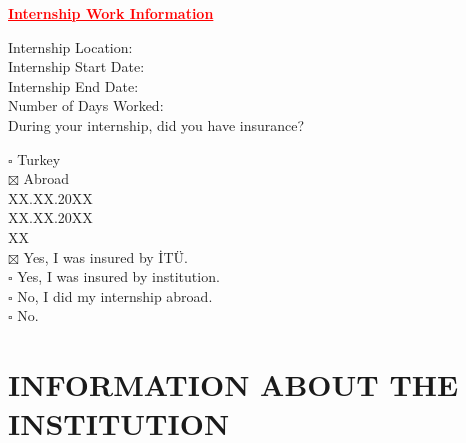 \documentclass[12pt]{article}
\begin{document}
\vspace{150pt}

{\centering
  \textcolor{red}{\bfseries \ul{Internship Work Information}}
  \\[1\baselineskip]
  \par}

\begin{minipage}[t]{0.4\textwidth}
  \begin{flushright}
    Internship Location: \\[1\baselineskip]
    Internship Start Date: \\
    Internship End Date: \\
    Number of Days Worked: \\
    During your internship, did you have insurance?
  \end{flushright}
\end{minipage}%
\hspace{0.5cm}
\begin{minipage}[t]{0.6\textwidth}
  $\square$ Turkey \\
  $\boxtimes$ Abroad \\
  XX.XX.20XX \\
  XX.XX.20XX \\
  XX \\
  $\boxtimes$ Yes, I was insured by İTÜ. \\
  $\square$ Yes, I was insured by institution. \\
  $\square$ No, I did my internship abroad. \\
  $\square$ No.\\
\end{minipage}

\newpage
{} %
\tableofcontents
{}  %

\newpage
{}
\section{INFORMATION ABOUT THE INSTITUTION}
\end{document}

